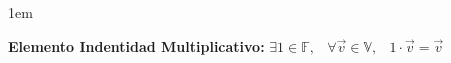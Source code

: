 \documentclass[12pt]{report}                                    %
\newenvironment{Indentation}[1][0.75em]                         %
    {\begin{adjustwidth}{#1}{}}                                     %
    {\end{adjustwidth}}                                             %
\DeclareMathOperator \Space {\quad}                             %
\DeclareMathOperator \MiniSpace {\;}                            %
\begin{document}
\begin{Indentation}[1em]
\begin{itemize}
{                \item 
                    \textbf{Elemento Indentidad Multiplicativo:}
                    $\exists 1 \in \mathbb{F}, \MiniSpace
                        \forall \vec{v} \in \mathbb{V}, \MiniSpace 1 \cdot \vec{v} = \vec{v}$

            }
            \end{itemize}
            \end{Indentation}
\end{document}
